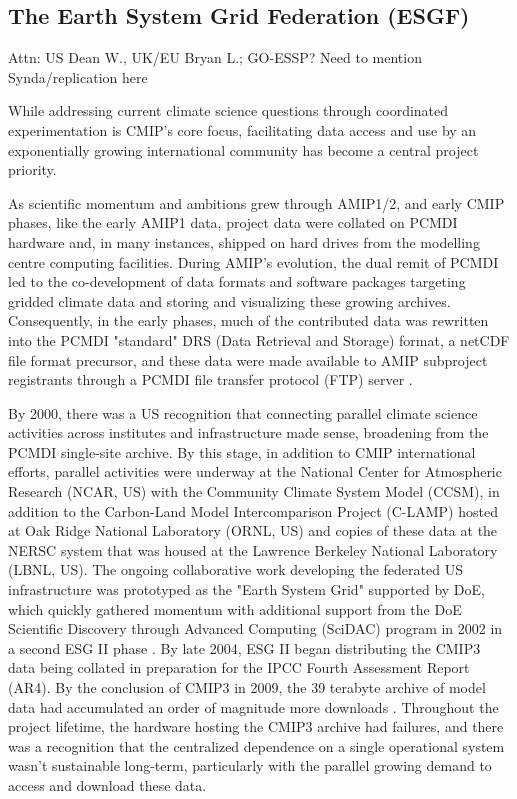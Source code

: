 \documentclass[gmd, preprint]{copernicus}
\def\cred#1{{\color{red}#1}}
\begin{document}
\subsection{The Earth System Grid Federation (ESGF)}
\label{sec:earthSystemGridFederation}
\cred{Attn: US Dean W., UK/EU Bryan L.; GO-ESSP? Need to mention Synda/replication here}

While addressing current climate science questions through coordinated experimentation is CMIP's core focus, facilitating data access and use by an exponentially growing international community has become a central project priority. 

As scientific momentum and ambitions grew through AMIP1/2, and early CMIP phases, like the early AMIP1 data, project data were collated on PCMDI hardware and, in many instances, shipped on hard drives from the modelling centre computing facilities. During AMIP's evolution, the dual remit of PCMDI led to the co-development of data formats and software packages targeting gridded climate data and storing and visualizing these growing archives. Consequently, in the early phases, much of the contributed data was rewritten into the PCMDI "standard" DRS (Data Retrieval and Storage) format, a netCDF file format precursor, and these data were made available to AMIP subproject registrants through a PCMDI file transfer protocol (FTP) server \citep[see \autoref{tab:tab1-MIPsThroughTime};][]{gates_amip_1995}.

By 2000, there was a US recognition that connecting parallel climate science activities across institutes and infrastructure made sense, broadening from the PCMDI single-site archive. By this stage, in addition to CMIP international efforts, parallel activities were underway at the National Center for Atmospheric Research (NCAR, US) with the Community Climate System Model (CCSM), in addition to the Carbon-Land Model Intercomparison Project (C-LAMP) hosted at Oak Ridge National Laboratory (ORNL, US) and copies of these data at the NERSC system that was housed at the Lawrence Berkeley National Laboratory (LBNL, US). The ongoing collaborative work developing the federated US infrastructure was prototyped as the "Earth System Grid" \citep[ESG I;][]{bernholdt_earth_2007} supported by DoE, which quickly gathered momentum with additional support from the DoE Scientific Discovery through Advanced Computing (SciDAC) program in 2002 in a second ESG II phase \citep{williams_earth_2009}. By late 2004, ESG II began distributing the CMIP3 data being collated in preparation for the IPCC Fourth Assessment Report (AR4). By the conclusion of CMIP3 in 2009, the 39 terabyte archive of model data had accumulated an order of magnitude more downloads \citep[420 terabytes;][]{ananthakrishnan_building_2007, williams_earth_2009}. Throughout the project lifetime, the hardware hosting the CMIP3 archive had failures, and there was a recognition that the centralized dependence on a single operational system wasn't sustainable long-term, particularly with the parallel growing demand to access and download these data.
\end{document}
